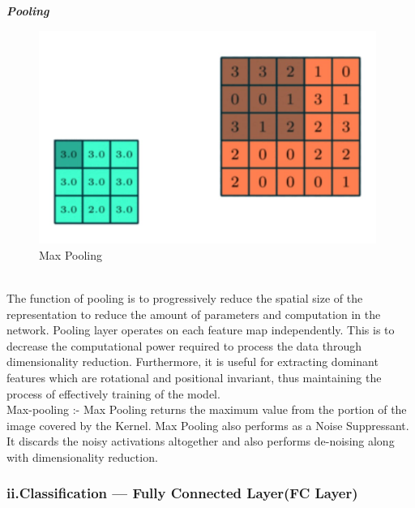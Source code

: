 \textbf{\emph{Pooling}}
\begin{figure}[h]
\label{ss}
\includegraphics[width= 11cm]{Max Pooling.jpeg}
\caption{Max Pooling}
\end{figure}
\\The function of pooling is to progressively reduce the spatial size of the representation to reduce the amount of parameters and computation in the network. Pooling layer operates on each feature map independently.
This is to decrease the computational power required to process the data through dimensionality reduction. Furthermore, it is useful for extracting dominant features which are rotational and positional invariant, thus maintaining the process of effectively training of the model.\\
Max-pooling :- Max Pooling returns the maximum value from the portion of the image covered by the Kernel. Max Pooling also performs as a Noise Suppressant. It discards the noisy activations altogether and also performs de-noising along with dimensionality reduction.
\subsubsection{ii.Classification — Fully Connected Layer(FC Layer)} 

